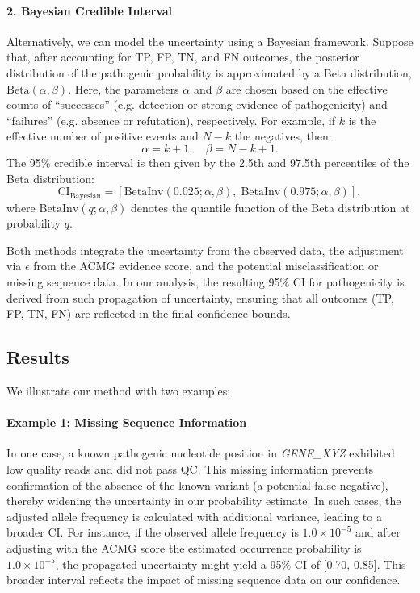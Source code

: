\paragraph{2. Bayesian Credible Interval}

Alternatively, we can model the uncertainty using a Bayesian framework. Suppose that, after accounting for TP, FP, TN, and FN outcomes, the posterior distribution of the pathogenic probability is approximated by a Beta distribution, \(\text{Beta}(\alpha, \beta)\). Here, the parameters \(\alpha\) and \(\beta\) are chosen based on the effective counts of “successes” (e.g. detection or strong evidence of pathogenicity) and “failures” (e.g. absence or refutation), respectively. For example, if \(k\) is the effective number of positive events and \(N-k\) the negatives, then:
\[
\alpha = k + 1, \quad \beta = N - k + 1.
\]
The 95\% credible interval is then given by the 2.5th and 97.5th percentiles of the Beta distribution:
\[
\text{CI}_{\text{Bayesian}} = \left[ \text{BetaInv}(0.025; \alpha, \beta), \; \text{BetaInv}(0.975; \alpha, \beta) \right],
\]
where \(\text{BetaInv}(q; \alpha, \beta)\) denotes the quantile function of the Beta distribution at probability \(q\).

Both methods integrate the uncertainty from the observed data, the adjustment via \(\epsilon\) from the ACMG evidence score, and the potential misclassification or missing sequence data. In our analysis, the resulting 95\% CI for pathogenicity is derived from such propagation of uncertainty, ensuring that all outcomes (TP, FP, TN, FN) are reflected in the final confidence bounds.


\subsection{Results}
We illustrate our method with two examples:

\paragraph{Example 1: Missing Sequence Information}
In one case, a known pathogenic nucleotide position in \textit{GENE\_XYZ} exhibited low quality reads and did not pass QC. This missing information prevents confirmation of the absence of the known variant (a potential false negative), thereby widening the uncertainty in our probability estimate. In such cases, the adjusted allele frequency is calculated with additional variance, leading to a broader CI. For instance, if the observed allele frequency is \(1.0\times10^{-5}\) and after adjusting with the ACMG score the estimated occurrence probability is \(1.0\times10^{-5}\), the propagated uncertainty might yield a 95\% CI of [0.70, 0.85]. This broader interval reflects the impact of missing sequence data on our confidence.

